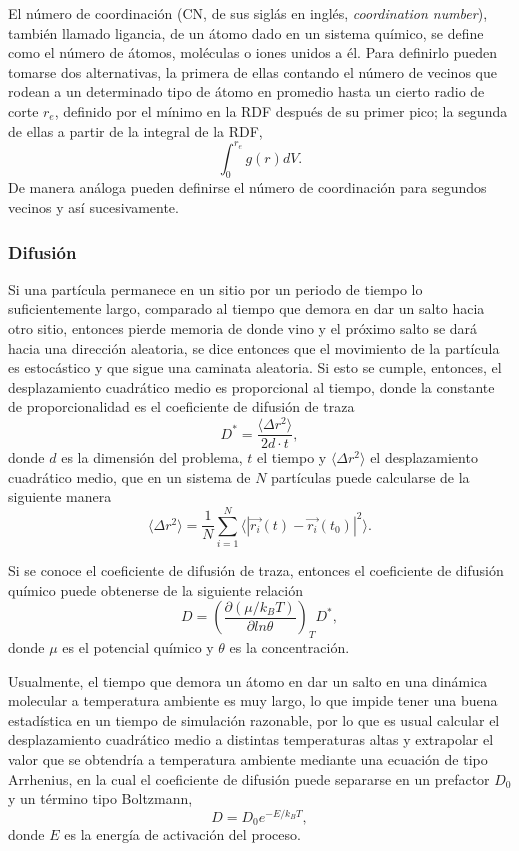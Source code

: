 El número de coordinación (CN, de sus siglás en inglés, \textit{coordination 
number}), también llamado ligancia, de un átomo dado en un sistema químico, se 
define como el número de átomos, moléculas o iones unidos a él. Para definirlo 
pueden tomarse dos alternativas, la primera de ellas contando el número de 
vecinos que rodean a un determinado tipo de átomo en promedio hasta un cierto
radio de corte $r_e$, definido por el mínimo en la RDF después de su primer 
pico; la segunda de ellas a partir de la integral de la RDF,
$$
\int_0^{r_e} g(r) dV.
$$
De manera análoga pueden definirse el número de coordinación para segundos 
vecinos y así sucesivamente.

\subsubsection{Difusión}

Si una partícula permanece en un sitio por un periodo de tiempo lo suficientemente 
largo, comparado al tiempo que demora en dar un salto hacia otro sitio, entonces 
pierde memoria de donde vino y el próximo salto se dará hacia una dirección 
aleatoria, se dice entonces que el movimiento de la partícula es estocástico y 
que sigue una caminata aleatoria. Si esto se cumple, entonces, el desplazamiento 
cuadrático medio es proporcional al tiempo, donde la constante de proporcionalidad 
es el coeficiente de difusión de traza
\begin{equation}
    D^{*} = \frac{\langle \Delta r^2 \rangle}{2d\cdot t},
\end{equation}
donde $d$ es la dimensión del problema, $t$ el tiempo y 
$\langle \Delta r^2 \rangle$ el desplazamiento cuadrático medio, que en un sistema 
de $N$ partículas puede calcularse de la siguiente manera
$$
\langle \Delta r^2 \rangle = \frac{1}{N} \sum_{i=1}^{N} \langle |\vec{r_i}(t) - \vec{r_i}(t_0)|^2 \rangle.
$$

Si se conoce el coeficiente de difusión de traza, entonces el coeficiente de 
difusión químico puede obtenerse de la siguiente relación ~\cite{gomer1990}
\begin{equation}
    D = \left( \frac{\partial (\mu / k_BT)}{\partial ln \theta} \right)_T D^{*},
\end{equation}
donde $\mu$ es el potencial químico y $\theta$ es la concentración.

Usualmente, el tiempo que demora un átomo en dar un salto en una dinámica 
molecular a temperatura ambiente es muy largo, lo que impide tener una buena 
estadística en un tiempo de simulación razonable, por lo que es usual calcular 
el desplazamiento cuadrático medio a distintas temperaturas altas y extrapolar
el valor que se obtendría a temperatura ambiente mediante una ecuación de tipo 
Arrhenius, en la cual el coeficiente de difusión puede separarse en un 
prefactor $D_0$ y un término tipo Boltzmann,
$$
D = D_0 e^{-E / k_BT},
$$
donde $E$ es la energía de activación del proceso. 


